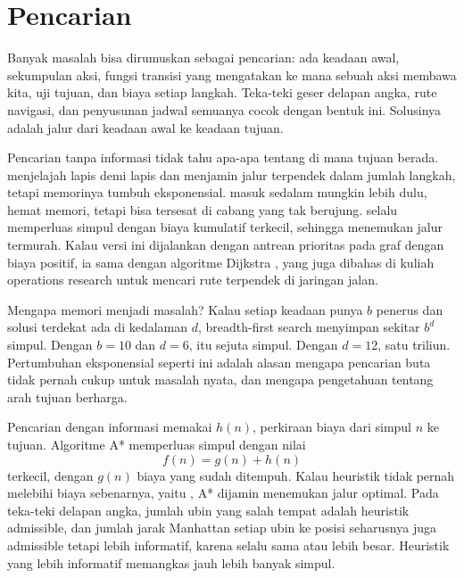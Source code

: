 \section{Pencarian}

Banyak masalah bisa dirumuskan sebagai pencarian: ada keadaan awal, sekumpulan aksi, fungsi
transisi yang mengatakan ke mana sebuah aksi membawa kita, uji tujuan, dan biaya setiap langkah.
Teka-teki geser delapan angka, rute navigasi, dan penyusunan jadwal semuanya cocok dengan bentuk
ini. Solusinya adalah jalur dari keadaan awal ke keadaan tujuan.

Pencarian tanpa informasi tidak tahu apa-apa tentang di mana tujuan berada.  menjelajah lapis demi lapis dan menjamin jalur terpendek dalam jumlah langkah, tetapi
memorinya tumbuh eksponensial.  masuk sedalam mungkin lebih dulu,
hemat memori, tetapi bisa tersesat di cabang yang tak berujung. 
selalu memperluas simpul dengan biaya kumulatif terkecil, sehingga menemukan jalur termurah. Kalau versi ini
dijalankan dengan antrean prioritas pada graf dengan biaya positif, ia sama dengan algoritme Dijkstra
\citep{dijkstra1959}, yang juga dibahas di kuliah operations research untuk mencari rute terpendek di jaringan jalan.

Mengapa memori menjadi masalah? Kalau setiap keadaan punya $b$ penerus dan solusi terdekat ada di kedalaman $d$,
breadth-first search menyimpan sekitar $b^d$ simpul. Dengan $b=10$ dan $d=6$, itu sejuta simpul. Dengan $d=12$, satu
triliun. Pertumbuhan eksponensial seperti ini adalah alasan mengapa pencarian buta tidak pernah cukup untuk masalah
nyata, dan mengapa pengetahuan tentang arah tujuan berharga.

Pencarian dengan informasi memakai  $h(n)$, perkiraan biaya dari simpul $n$ ke
tujuan. Algoritme A* \citep{hart1968} memperluas simpul dengan nilai
\begin{equation}
f(n)=g(n)+h(n)
\end{equation}
terkecil, dengan $g(n)$ biaya yang sudah ditempuh. Kalau heuristik tidak pernah melebihi biaya
sebenarnya, yaitu , A* dijamin menemukan jalur optimal. Pada teka-teki delapan
angka, jumlah ubin yang salah tempat adalah heuristik admissible, dan jumlah jarak Manhattan setiap
ubin ke posisi seharusnya juga admissible tetapi lebih informatif, karena selalu sama atau lebih
besar. Heuristik yang lebih informatif memangkas jauh lebih banyak simpul.

